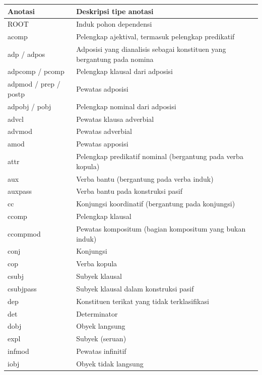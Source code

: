 \begin{center}
\begin{small}
\caption{Kerangka anotasi berdasarkan \textit{universal Stanford Dependencies} (USD) \citep{de2014universal}} \label{tab:tipe_anotasi}
\begin{longtable}{| p{} | p{} |} 
  \hline
Anotasi & Deskripsi tipe anotasi \\ \hline
ROOT & Induk pohon dependensi \\ \hline
acomp & Pelengkap ajektival, termasuk pelengkap predikatif \\ \hline
adp / adpos & Adposisi yang dianalisis sebagai konstituen yang bergantung pada nomina \\ \hline
adpcomp / pcomp & Pelengkap klausal dari adposisi \\ \hline
adpmod / prep / postp & Pewatas adposisi \\ \hline
adpobj / pobj & Pelengkap nominal dari adposisi \\ \hline
advcl & Pewatas klausa adverbial \\ \hline
advmod & Pewatas adverbial \\ \hline
amod & Pewatas apposisi \\ \hline
attr & Pelengkap predikatif nominal (bergantung pada verba kopula) \\ \hline
aux & Verba bantu (bergantung pada verba induk) \\ \hline
auxpass & Verba bantu pada konstruksi pasif \\ \hline
cc & Konjungsi koordinatif (bergantung pada konjungsi) \\ \hline
ccomp & Pelengkap klausal \\ \hline
ccompmod & Pewatas kompositum (bagian kompositum yang bukan induk) \\ \hline
conj & Konjungsi \\ \hline
cop & Verba kopula \\ \hline
csubj & Subyek klausal \\ \hline
csubjpass & Subyek klausal dalam konstruksi pasif \\ \hline
dep & Konstituen terikat yang tidak terklasifikasi \\ \hline
det & Determinator \\ \hline
dobj & Obyek langsung \\ \hline
expl & Subyek (seruan) \\ \hline
infmod & Pewatas infinitif \\ \hline
iobj & Obyek tidak langsung \\ \hline

\end{longtable}
\end{small}
\end{center}
